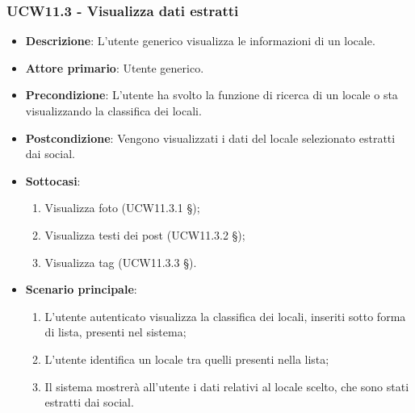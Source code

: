\subsubsection{UCW11.3 - Visualizza dati estratti}
\begin{itemize}
    \item \textbf{Descrizione}: L'utente generico visualizza le informazioni di un locale.
    \item \textbf{Attore primario}: Utente generico.
    \item \textbf{Precondizione}: L'utente ha svolto la funzione di ricerca di un locale o sta visualizzando la classifica dei locali.
    \item \textbf{Postcondizione}: Vengono visualizzati i dati del locale selezionato estratti dai social.
    \item \textbf{Sottocasi}:
	\begin{enumerate}
		\item Visualizza foto (UCW11.3.1 \S{});
		\item Visualizza testi dei post (UCW11.3.2 \S{});
		\item Visualizza tag (UCW11.3.3 \S{}).
	\end{enumerate}
    \item \textbf{Scenario principale}: 
    \begin{enumerate}
	\item L'utente autenticato visualizza la classifica dei locali, inseriti sotto forma di lista, presenti nel sistema;
    \item L'utente identifica un locale tra quelli presenti nella lista;
    \item Il sistema mostrerà all'utente i dati relativi al locale scelto, che sono stati estratti dai social.
    \end{enumerate}
\end{itemize}

